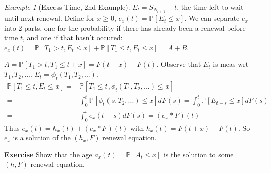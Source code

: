 \documentclass[12pt]{book}
\theoremstyle{definition}
\theoremstyle{remark}
\newtheorem{ex}{Example}[section]
\begin{document}
\begin{ex}[Excess Time, 2nd Example]
	$E_t = S_{N_{t+1}}-t$, the time left to wait until next renewal. Define for  $x \geq 0$, $e_x(t) = \mathbb{P}_{} \left[ E_t \leq x \right] $. We can separate $e_x$ into 2 parts, one for the probability if there has already been a renewal before time $t$, and one if that hasn't occured: $e_x(t) = \mathbb{P}_{} \left[ T_1 > t, E_t \leq x \right]  + \mathbb{P}_{} \left[ T_1 \leq t, E_t \leq x \right]  = A + B$.

	$A = \mathbb{P}_{} \left[ T_1 > t, T_1 \leq t+x \right] = F(t+x)-F(t)$. Observe that $E_t$ is meas wrt $T_1, T_2,...$. $E_t = \phi_t(T_1,T_2,...)$. 
\begin{align}
	\mathbb{P}_{} \left[ T_1 \leq t, E_t \leq x \right] =& \mathbb{P}_{} \left[ T_1 \leq t, \phi_t(T_1,T_2,...) \leq x \right] \\ 
	=& \int_{0}^{t} \mathbb{P}_{} \left[ \phi_t(s, T_2,...) \leq x \right] dF(s) = \int_{0}^{t} \mathbb{P}_{} \left[ E_{t-s} \leq x \right] dF(s) \\
	=& \int_{0}^{t} e_x(t-s) dF(s) = (e_x * F)(t)
\end{align}
Thus $e_x(t) = h_x(t) + (e_x * F)(t)$ with $h_x(t) = F(t+x)-F(t)$. So  $e_x$ is a solution of the $(h_x,F)$ renewal equation.
\end{ex}

\textbf{Exercise} Show that the age $a_x(t) = \mathbb{P}_{} \left[ A_t \leq x \right] $ is the solution to some $(h,F)$ renewal equation.
\end{document}
